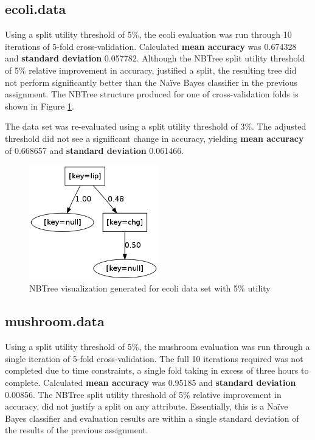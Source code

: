 \documentclass[10pt]{report}
\begin{document}
\subsection*{ecoli.data}
Using a split utility threshold of 5\%, the ecoli evaluation was run
through 10 iterations of 5-fold 
cross-validation. Calculated \textbf{mean accuracy} was 0.674328 and 
\textbf{standard deviation} 0.057782. Although the NBTree split utility
threshold of 5\% relative improvement in accuracy, justified a split,
the resulting tree did not perform significantly better than the
Na\"{i}ve Bayes classifier in the previous assignment. The NBTree
structure produced for one of cross-validation folds is shown in Figure
\ref{fig:ecoli}. 

The data set was re-evaluated using a split utility threshold of 3\%. The
adjusted threshold did not see a significant change in accuracy,
yielding \textbf{mean accuracy} of 0.668657 and \textbf{standard
  deviation} 0.061466.

\begin{figure}
  \begin{center}
	\includegraphics[width=0.5\textwidth,height=!]{ecoli}
  \end{center}
  \caption{NBTree visualization generated for ecoli data set with 5\%
    utility }
  \label{fig:ecoli}
\end{figure} 


\subsection*{mushroom.data}
Using a split utility threshold of 5\%, the mushroom evaluation was
run through a single iteration of 5-fold
cross-validation. The full 10 iterations required was not completed
due to time constraints, a single fold taking in excess of three hours
to complete. Calculated \textbf{mean accuracy} was 0.95185 and
\textbf{standard deviation} 0.00856. The NBTree split utility
threshold of 5\% relative improvement in accuracy, did not justify a
split on any attribute. Essentially, this is a Na\"{i}ve Bayes
classifier and evaluation results are within a single standard
deviation of the results of the previous assignment.
\end{document}
